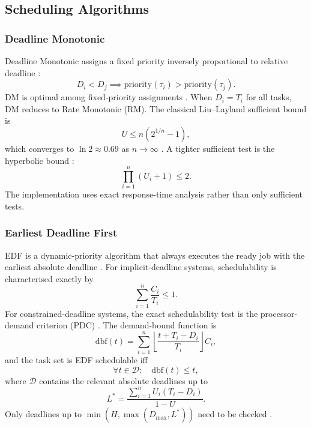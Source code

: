 \documentclass[11pt,a4paper]{article}
\begin{document}
\subsection{Scheduling Algorithms}

\subsubsection{Deadline Monotonic}
Deadline Monotonic assigns a fixed priority inversely proportional to relative deadline \cite{LW82,buttazzo2024}:
\begin{equation}
D_i < D_j \implies \mathrm{priority}(\tau_i) > \mathrm{priority}(\tau_j).
\label{eq:dm-priority}
\end{equation}
DM is optimal among fixed-priority assignments \cite{buttazzo2024}. When \(D_i=T_i\) for all tasks, DM reduces to Rate Monotonic (RM). The classical Liu--Layland sufficient bound is
\begin{equation}
U \leq n\left(2^{1/n} - 1\right),
\label{eq:ll-bound}
\end{equation}
which converges to \(\ln 2 \approx 0.69\) as \(n \to \infty\) \cite{LL73}. A tighter sufficient test is the hyperbolic bound \cite{Bini2001}:
\begin{equation}
\prod_{i=1}^{n}(U_i + 1) \leq 2.
\label{eq:hyperbolic}
\end{equation}
The implementation uses exact response-time analysis rather than only sufficient tests.

\subsubsection{Earliest Deadline First}
EDF is a dynamic-priority algorithm that always executes the ready job with the earliest absolute deadline \cite{LL73}. For implicit-deadline systems, schedulability is characterised exactly by
\begin{equation}
\sum_{i=1}^{n} \frac{C_i}{T_i} \leq 1.
\label{eq:edf-util}
\end{equation}
For constrained-deadline systems, the exact schedulability test is the processor-demand criterion (PDC) \cite{Baruah1990,buttazzo2024}. The demand-bound function is
\begin{equation}
\mathrm{dbf}(t) = \sum_{i=1}^{n} \left\lfloor \frac{t + T_i - D_i}{T_i} \right\rfloor C_i,
\label{eq:dbf}
\end{equation}
and the task set is EDF schedulable iff
\begin{equation}
\forall t \in \mathcal{D}: \quad \mathrm{dbf}(t) \leq t,
\label{eq:pdc}
\end{equation}
where \(\mathcal{D}\) contains the relevant absolute deadlines up to
\begin{equation}
L^* = \frac{\sum_{i=1}^{n} U_i(T_i - D_i)}{1-U}.
\label{eq:lstar}
\end{equation}
Only deadlines up to \(\min(H,\max(D_{\max},L^*))\) need to be checked \cite{buttazzo2024}.
\end{document}

